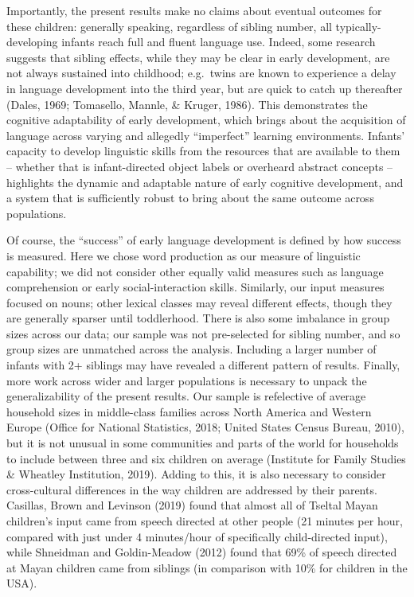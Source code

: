 \documentclass[
  english,
  man,floatsintext]{apa6}
\begin{document}
Importantly, the present results make no claims about eventual outcomes for these children: generally speaking, regardless of sibling number, all typically-developing infants reach full and fluent language use. Indeed, some research suggests that sibling effects, while they may be clear in early development, are not always sustained into childhood; e.g.~twins are known to experience a delay in language development into the third year, but are quick to catch up thereafter (Dales, 1969; Tomasello, Mannle, \& Kruger, 1986). This demonstrates the cognitive adaptability of early development, which brings about the acquisition of language across varying and allegedly \enquote{imperfect} learning environments. Infants' capacity to develop linguistic skills from the resources that are available to them -- whether that is infant-directed object labels or overheard abstract concepts -- highlights the dynamic and adaptable nature of early cognitive development, and a system that is sufficiently robust to bring about the same outcome across populations.

Of course, the \enquote{success} of early language development is defined by how success is measured. Here we chose word production as our measure of linguistic capability; we did not consider other equally valid measures such as language comprehension or early social-interaction skills. Similarly, our input measures focused on nouns; other lexical classes may reveal different effects, though they are generally sparser until toddlerhood. There is also some imbalance in group sizes across our data; our sample was not pre-selected for sibling number, and so group sizes are unmatched across the analysis. Including a larger number of infants with 2+ siblings may have revealed a different pattern of results. Finally, more work across wider and larger populations is necessary to unpack the generalizability of the present results. Our sample is refelective of average household sizes in middle-class families across North America and Western Europe (Office for National Statistics, 2018; United States Census Bureau, 2010), but it is not unusual in some communities and parts of the world for households to include between three and six children on average (Institute for Family Studies \& Wheatley Institution, 2019). Adding to this, it is also necessary to consider cross-cultural differences in the way children are addressed by their parents. Casillas, Brown and Levinson (2019) found that almost all of Tseltal Mayan children's input came from speech directed at other people (21 minutes per hour, compared with just under 4 minutes/hour of specifically child-directed input), while Shneidman and Goldin-Meadow (2012) found that 69\% of speech directed at Mayan children came from siblings (in comparison with 10\% for children in the USA).
\end{document}
